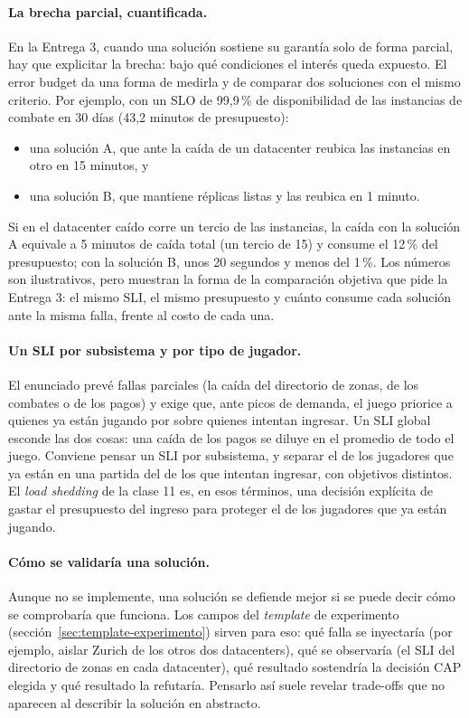 \documentclass[variant=apuntes,cover=institutional,mode=screen]{ua-engineering-v6-article}
\begin{document}
\paragraph{La brecha parcial, cuantificada.} En la Entrega 3, cuando una solución sostiene su garantía solo de forma parcial, hay que explicitar la brecha: bajo qué condiciones el interés queda expuesto. El error budget da una forma de medirla y de comparar dos soluciones con el mismo criterio. Por ejemplo, con un SLO de 99,9\,\% de disponibilidad de las instancias de combate en 30 días (43,2 minutos de presupuesto):
\begin{itemize}
\item una solución A, que ante la caída de un datacenter reubica las instancias en otro en 15 minutos, y
\item una solución B, que mantiene réplicas listas y las reubica en 1 minuto.
\end{itemize}
Si en el datacenter caído corre un tercio de las instancias, la caída con la solución A equivale a 5 minutos de caída total (un tercio de 15) y consume el 12\,\% del presupuesto; con la solución B, unos 20 segundos y menos del 1\,\%. Los números son ilustrativos, pero muestran la forma de la comparación objetiva que pide la Entrega 3: el mismo SLI, el mismo presupuesto y cuánto consume cada solución ante la misma falla, frente al costo de cada una.

\paragraph{Un SLI por subsistema y por tipo de jugador.} El enunciado prevé fallas parciales (la caída del directorio de zonas, de los combates o de los pagos) y exige que, ante picos de demanda, el juego priorice a quienes ya están jugando por sobre quienes intentan ingresar. Un SLI global esconde las dos cosas: una caída de los pagos se diluye en el promedio de todo el juego. Conviene pensar un SLI por subsistema, y separar el de los jugadores que ya están en una partida del de los que intentan ingresar, con objetivos distintos. El \emph{load shedding} de la clase 11 es, en esos términos, una decisión explícita de gastar el presupuesto del ingreso para proteger el de los jugadores que ya están jugando.

\paragraph{Cómo se validaría una solución.} Aunque no se implemente, una solución se defiende mejor si se puede decir cómo se comprobaría que funciona. Los campos del \emph{template} de experimento (sección~\ref{sec:template-experimento}) sirven para eso: qué falla se inyectaría (por ejemplo, aislar Zurich de los otros dos datacenters), qué se observaría (el SLI del directorio de zonas en cada datacenter), qué resultado sostendría la decisión CAP elegida y qué resultado la refutaría. Pensarlo así suele revelar trade-offs que no aparecen al describir la solución en abstracto.
\end{document}
